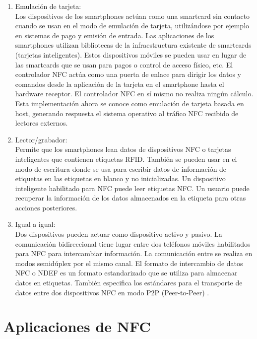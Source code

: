 \documentclass[12pt,a4paper,onecolumn,oneside]{report}
\begin{document}
\begin{enumerate}

\item Emulación de tarjeta:\\
Los dispositivos de los smartphones actúan como una smartcard sin contacto cuando se usan en el modo de emulación de tarjeta,  utilizándose por ejemplo en sistemas de pago y emisión de entrada. Las aplicaciones de los smartphones utilizan bibliotecas de la infraestructura existente de smartcards (tarjetas inteligentes). Estos dispositivos móviles se pueden usar en lugar de las smartcards que se usan para pagos o control de acceso físico, etc. El controlador NFC actúa como una puerta de enlace para dirigir los datos y comandos desde la aplicación de la tarjeta en el smartphone hasta el hardware receptor. El controlador NFC en sí mismo no realiza ningún cálculo. Esta implementación ahora se conoce como emulación de tarjeta basada en host, generando respuesta el sistema operativo al tráfico NFC recibido de lectores externos.

\item Lector/grabador:\\
Permite que los smartphones lean datos de dispositivos NFC o tarjetas inteligentes que contienen etiquetas RFID. También se pueden usar en el modo de escritura donde se usa para escribir datos de información de etiquetas en las etiquetas en blanco y no inicializadas. Un dispositivo inteligente habilitado para NFC puede leer etiquetas NFC. Un usuario puede recuperar la información de los datos almacenados en la etiqueta para otras acciones posteriores.

\item Igual a igual:\\
Dos dispositivos pueden actuar como dispositivo activo y pasivo. La comunicación bidireccional tiene lugar entre dos teléfonos móviles habilitados para NFC para intercambiar información. La comunicación entre se realiza en modos semidúplex por el mismo canal. El formato de intercambio de datos NFC o NDEF \cite{cinco} es un formato estandarizado que se utiliza para almacenar datos en etiquetas. También especifica los estándares para el transporte de datos entre dos dispositivos NFC en modo P2P (Peer-to-Peer) \cite{seis}. 

\end{enumerate}

\section*{Aplicaciones de NFC}
\end{document}

